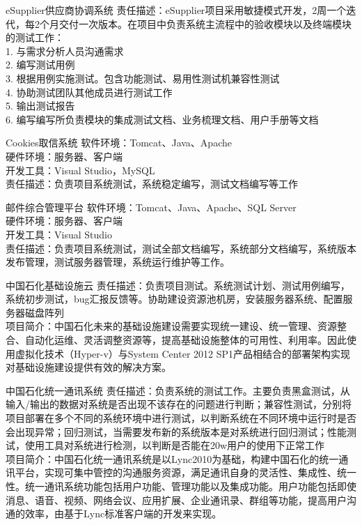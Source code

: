 \documentclass[11pt,a4paper]{moderncv}
\begin{document}
{eSupplier供应商协调系统}{}{}{}
{责任描述：eSupplier项目采用敏捷模式开发，2周一个迭代，每2个月交付一次版本。在项目中负责系统主流程中的验收模块以及终端模块的测试工作：\\
1. 与需求分析人员沟通需求\\
2. 编写测试用例\\
3. 根据用例实施测试。包含功能测试、易用性测试机兼容性测试\\
4. 协助测试团队其他成员进行测试工作\\
5. 输出测试报告\\
6. 编写编写所负责模块的集成测试文档、业务梳理文档、用户手册等文档
}


{Cookies取信系统}
{}
{}{}
{软件环境：Tomcat、Java、Apache\\
硬件环境：服务器、客户端\\
开发工具：Visual Studio，MySQL\\
责任描述：负责项目系统测试，系统稳定编写，测试文档编写等工作
}

{邮件综合管理平台}
{}
{}{}
{软件环境：Tomcat、Java、Apache、SQL Server\\
硬件环境：服务器、客户端\\
开发工具：Visual Studio\\
责任描述：负责项目系统测试，测试全部文档编写，系统部分文档编写，系统版本发布管理，测试服务器管理，系统运行维护等工作。
}

{中国石化基础设施云}
{}
{}{}
{责任描述：负责项目测试。系统测试计划、测试用例编写，系统初步测试，bug汇报反馈等。协助建设资源池机房，安装服务器系统、配置服务器磁盘阵列\\
项目简介：中国石化未来的基础设施建设需要实现统一建设、统一管理、资源整合、自动化运维、灵活调整资源等，提高基础设施整体的可用性、利用率。因此使用虚拟化技术（Hyper-v）与System Center 2012 SP1产品相结合的部署架构实现对基础设施建设提供有效的解决方案。}

{中国石化统一通讯系统}
{}
{}{}
{责任描述：负责系统的测试工作。主要负责黑盒测试，从输入/输出的数据对系统是否出现不该存在的问题进行判断；兼容性测试，分别将项目部署在多个不同的系统环境中进行测试，以判断系统在不同环境中运行时是否会出现异常；回归测试，当需要发布新的系统版本是对系统进行回归测试；性能测试，使用工具对系统进行检测，以判断是否能在20w用户的使用下正常工作\\
项目简介：中国石化统一通讯系统是以Lync2010为基础，构建中国石化的统一通讯平台，实现可集中管控的沟通服务资源，满足通讯自身的灵活性、集成性、统一性。统一通讯系统功能包括用户功能、管理功能以及集成功能。用户功能包括即使消息、语音、视频、网络会议、应用扩展、企业通讯录、群组等功能，提高用户沟通的效率，由基于Lync标准客户端的开发来实现。
}
\end{document}

